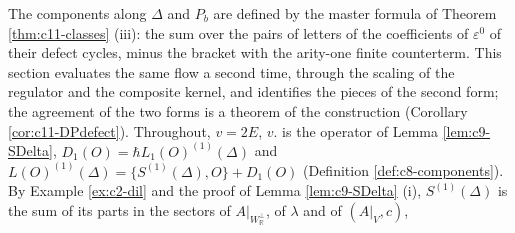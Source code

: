 The components along $\Delta$ and $P_b$ are defined by the master formula of Theorem \ref{thm:c11-classes} (iii): the sum over the pairs of letters of the coefficients of $\varepsilon^0$ of their defect cycles, minus the bracket with the arity-one finite counterterm. This section evaluates the same flow a second time, through the scaling of the regulator and the composite kernel, and identifies the pieces of the second form; the agreement of the two forms is a theorem of the construction (Corollary \ref{cor:c11-DPdefect}). Throughout, $v=2E$, $v.$ is the operator of Lemma \ref{lem:c9-SDelta}, $D_1(O)=\hbar L_1(O)^{(1)}(\Delta)$ and $L(O)^{(1)}(\Delta)=\{S^{(1)}(\Delta),O\}+D_1(O)$ (Definition \ref{def:c8-components}). By Example \ref{ex:c2-dil} and the proof of Lemma \ref{lem:c9-SDelta} (i), $S^{(1)}(\Delta)$ is the sum of its parts in the sectors of $A|_{W_{\mathbb R}^\perp}$, of $\lambda$ and of $(A|_V,c)$,
